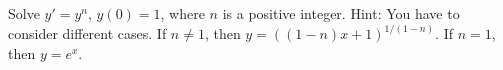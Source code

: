 {Solve $y' = y^n$, $y(0) = 1$, where $n$ is a positive integer.
Hint: You have to consider different cases.}
{If $n \not= 1$, then
$y={\left((1-n)x+1\right)}^{1/(1-n)}$.
If $n=1$, then $y = e^x$.}